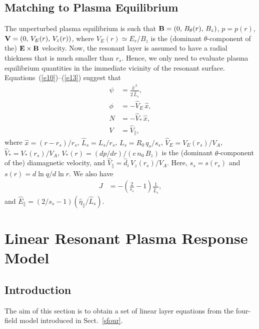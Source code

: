 \documentclass[12pt,prb,aps]{revtex4-1}
\begin{document}
\subsection{Matching to Plasma Equilibrium}
The unperturbed plasma equilibrium is such that
${\bf B} = (0,\,B_\theta(r),\,B_z)$,  $p = p(r)$,
${\bf V} = (0,\,V_E(r),\,V_z(r))$,
where 
$V_E(r)\simeq E_r/B_z$
 is the (dominant $\theta$-component of the) ${\bf E}\times {\bf B}$ velocity. Now, the resonant layer is assumed to have a radial thickness that is
much smaller than $r_s$.   Hence, we only need to evaluate plasma equilibrium quantities in the immediate vicinity of the resonant
surface. Equations~(\ref{e10})--(\ref{e13}) suggest that 
\begin{align}
\psi&= \frac{\hat{x}^{\,2}}{2\,\hat{L}_s},\label{e23}\\[0.5ex]
\phi &= - \hat{V}_E\,\hat{x},\\[0.5ex]
N &= -\hat{V}_\ast\,\hat{x},\\[0.5ex]
V &= \hat{V}_\parallel,\label{e26}
\end{align}
where 
$\hat{x}=(r-r_s)/r_s$,
 $\hat{L}_s=L_s/r_s$,  $L_s=R_0\,q_s/s_s$, 
  $\hat{V}_E= V_E(r_s)/V_A$,
$\hat{V}_\ast= V_\ast(r_s)/V_A$,
$V_\ast(r) = (dp/dr)/(e\,n_0\,B_z)$ 
is the (dominant $\theta$-component of the) diamagnetic velocity,
  and 
 $\hat{V}_\parallel=\hat{d}_i\, V_z(r_s)/V_A$. Here, $s_s=s(r_s)$ and $s(r)=d\ln q/d\ln r$. We also have
 \begin{align}\label{e28}
 J &= -\left(\frac{2}{s_s}-1\right)\frac{1}{\hat{L}_s},
\end{align} 
and $ \hat{E}_\parallel =(2/s_s-1) (\hat{\eta}_\parallel/\hat{L}_s)$.

\section{Linear Resonant Plasma Response Model}\label{layer}
\subsection{Introduction}
The aim of this section is to obtain a set of linear layer equations from the four-field model
introduced in Sect.~\ref{sfour}.
\end{document}
